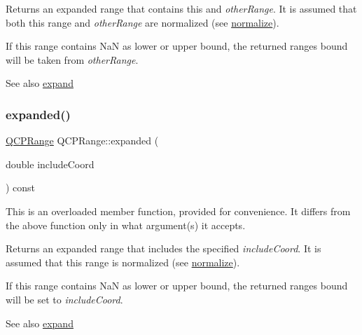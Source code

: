 Returns an expanded range that contains this and {\itshape other\+Range}. It is assumed that both this range and {\itshape other\+Range} are normalized (see \hyperlink{class_q_c_p_range_af914a7740269b0604d0827c634a878a9}{normalize}).

If this range contains NaN as lower or upper bound, the returned range\textquotesingle{}s bound will be taken from {\itshape other\+Range}.

\begin{DoxySeeAlso}{See also}
\hyperlink{class_q_c_p_range_a0fa1bc8048be50d52bea93a8caf08305}{expand} 
\end{DoxySeeAlso}
\mbox{\label{class_q_c_p_range_af81d70f1add7233d73a19dcbe5decb2e}} 
\subsubsection{\texorpdfstring{expanded()}{expanded()}\hspace{0.1cm}{\footnotesize\ttfamily [2/2]}}
{\footnotesize\ttfamily \hyperlink{class_q_c_p_range}{Q\+C\+P\+Range} Q\+C\+P\+Range\+::expanded (\begin{DoxyParamCaption}\item[{double}]{include\+Coord }\end{DoxyParamCaption}) const}

This is an overloaded member function, provided for convenience. It differs from the above function only in what argument(s) it accepts.

Returns an expanded range that includes the specified {\itshape include\+Coord}. It is assumed that this range is normalized (see \hyperlink{class_q_c_p_range_af914a7740269b0604d0827c634a878a9}{normalize}).

If this range contains NaN as lower or upper bound, the returned range\textquotesingle{}s bound will be set to {\itshape include\+Coord}.

\begin{DoxySeeAlso}{See also}
\hyperlink{class_q_c_p_range_a0fa1bc8048be50d52bea93a8caf08305}{expand} 
\end{DoxySeeAlso}
\mbox{\label{class_q_c_p_range_af914a7740269b0604d0827c634a878a9}} 

